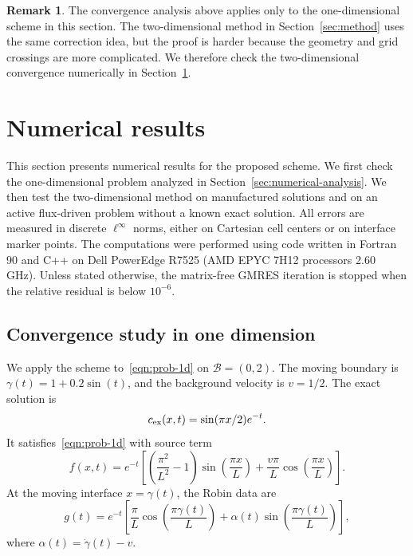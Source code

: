 \documentclass[11pt,reqno]{amsart}
\theoremstyle{plain}
\theoremstyle{definition}
\newtheorem{remark}[theorem]{Remark}
\numberwithin{equation}{section}
\newcommand{\mc}[1]{\mathcal{#1}}
\begin{document}
\begin{remark}
The convergence analysis above applies only to the one-dimensional scheme in
this section. The two-dimensional method in Section~\ref{sec:method} uses the
same correction idea, but the proof is harder because the geometry and grid
crossings are more complicated. We therefore check the two-dimensional
convergence numerically in Section~\ref{sec:results}.
\end{remark}

\hypersetup{linkcolor=black,citecolor=black,urlcolor=black}

\section{Numerical results}\label{sec:results}

This section presents numerical results for the proposed scheme.
We first check the one-dimensional problem analyzed in
Section~\ref{sec:numerical-analysis}. We then test the two-dimensional method
on manufactured solutions and on an active flux-driven problem without a known
exact solution. All errors are measured in discrete $\ell^\infty$ norms, either
on Cartesian cell centers or on interface marker points. The computations were
performed using code written in Fortran 90 and C++ on Dell PowerEdge R7525
(AMD EPYC 7H12 processors 2.60 GHz). Unless stated otherwise, the matrix-free
GMRES iteration is stopped when the relative residual is below $10^{-6}$.


\subsection{Convergence study in one dimension}\label{sect:1Dconv}
We apply the scheme to~\eqref{eqn:prob-1d} on
$\mc B=(0,2)$. The moving boundary is
$\gamma(t)=1+0.2\sin(t)$, and the background velocity is $v=1/2$. The exact
solution is
\begin{equation}
    c_{\rm ex}(x,t)=\sin(\pi x/2)e^{-t}.
\end{equation}
It satisfies~\eqref{eqn:prob-1d} with source term
\begin{equation}
    f(x,t) = e^{-t} \left[ \left( \frac{\pi^2}{L^2} - 1 \right) \sin\left(\frac{\pi x}{L}\right) + \frac{v \pi}{L} \cos\left(\frac{\pi x}{L}\right) \right].
\end{equation}
At the moving interface $x=\gamma(t)$, the Robin data are
\begin{equation}
    g(t) = e^{-t} \left[ \frac{\pi}{L} \cos\left(\frac{\pi \gamma(t)}{L}\right) + \alpha(t) \sin\left(\frac{\pi \gamma(t)}{L}\right) \right],
\end{equation}
where $\alpha(t)=\dot{\gamma}(t)-v$.
\end{document}
